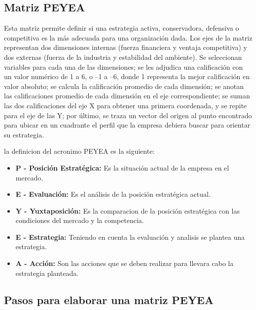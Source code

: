 

\subsection{Matriz PEYEA}
Esta matriz permite definir si una estrategia activa, conservadora, defensiva o competitiva es la más adecuada para una organización dada. Los ejes de la matriz representan dos dimensiones internas (fuerza financiera y ventaja competitiva) y dos externas (fuerza de la industria y estabilidad del ambiente). Se seleccionan variables para cada una de las dimensiones; se les adjudica una calificación con un valor numérico de 1 a 6, o –1 a –6, donde 1 representa la mejor calificación en valor absoluto; se calcula la calificación promedio de cada dimensión; se anotan las calificaciones promedio de cada dimensión en el eje correspondiente; se suman las dos calificaciones del eje X para obtener una primera coordenada, y se repite para el eje de las Y; por último, se traza un vector del origen al punto encontrado para ubicar en un cuadrante el perfil que la empresa debiera buscar para orientar su estrategia.\cite{DOFA}

la definicion del acronimo PEYEA es la siguiente:
\begin{itemize}
    \item \textbf{P - Posición Estratégica:} Es la situación actual de la empresa en el mercado.
    \item \textbf{E - Evaluación:} Es el análisis de la posición estratégica actual.
    \item \textbf{Y - Yuxtaposición:} Es la comparacion de la posición estratégica con las condiciones del mercado y la competencia.
    \item \textbf{E - Estrategia:} Teniendo en cuenta la evaluación y analisis se plantea una estrategia.
    \item \textbf{A - Acción:} Son las acciones que se deben realizar para llevara cabo la estrategia planteada.
\end{itemize}

\subsection{Pasos para elaborar una matriz PEYEA}

